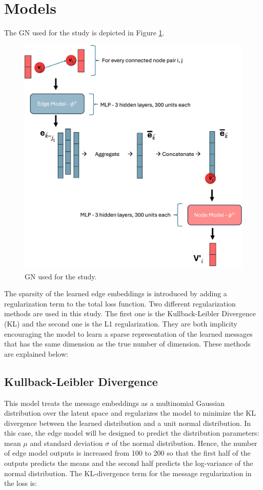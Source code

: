 \documentclass{article}
\begin{document}
\section{Models}


The GN used for the study is depicted in Figure \ref{fig:gn}.

\begin{figure}[H]
    \centering
    \includegraphics[width=\textwidth]{images/model.png}
    \caption{GN used for the study.}
    \label{fig:gn}
\end{figure}

The sparsity of the learned edge embeddings is introduced by adding a regularization term to the total loss function. Two different regularization methods are used in this study. The first one is the Kullback-Leibler Divergence (KL) and the second one is the L1 regularization. They are both implicity encouraging the model to learn a sparse representation of the learned messages that has the same dimension as the true number of dimension. These methods are explained below:

\subsection{Kullback-Leibler Divergence}
This model treats the message embeddings as a multinomial Gaussian distribution over the latent space and regularizes the model to minimize the KL divergence between the learned distribution and a unit normal distribution. In this case, the edge model will be designed to predict the distribution parameters: mean $\mu$ and standard deviation $\sigma$ of the normal distribution. Hence, the number of edge model outputs is increased from 100 to 200 so that the first half of the outputs predicts the means and the second half predicts the log-variance of the normal distribution. The KL-divergence term for the message regularization in the loss is:
\end{document}
